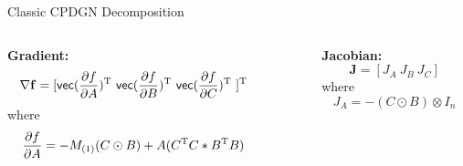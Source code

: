 \documentclass[final,hyperref={pdfpagelabels=false}]{beamer}
\begin{document}
\begin{frame}[t]
\begin{columns}[t]
\begin{column}{.5\linewidth}
\begin{block}{Classic CPDGN Decomposition}
            \begin{columns}[t]
                \begin{column}{.45\linewidth}
                    \textbf{Gradient:}
                        \begin{equation*}
                            \nabla \mathbf{f} = [
                                \mathsf{vec}(\frac{\partial f}{\partial A})^{\text T} \
                                \mathsf{vec}(\frac{\partial f}{\partial B})^{\text T} \
                                \mathsf{vec}(\frac{\partial f}{\partial C})^{\text T} \ ]^{\text T}
                        \end{equation*}
                        where
                        \begin{equation*}
                            \frac{\partial f}{\partial A} = -M_{(1)}(C\odot B) + A(C^{\text T} C\ast B^{\text T} B)
                        \end{equation*}
                \end{column}
                \begin{column}{.10\linewidth}
                \end{column}
                \begin{column}{.40\linewidth}
                    \textbf{Jacobian:}
                    \begin{equation*}
                        \mathbf{J} = [J_A \ J_B \ J_C]
                    \end{equation*}
                    where\\
                    \begin{equation*}
                        J_A = -(C\odot B) \otimes I_n
                    \end{equation*}
                \end{column}
            \end{columns}
        \end{block}
    \end{column}








\end{columns}
\end{frame}
\end{document}
